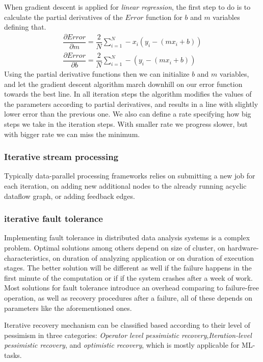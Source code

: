 When gradient descent is applied for \textit{linear regression}, the first step to do is to calculate the partial derivatives of the $Error$ function for  $b$ and $m$ variables defining that.
\begin{align}
\dfrac{\partial Error}{\partial m} = \dfrac{2}{N}\sum_{i=1}^{N} -x_i(y_i-(mx_i+b)) \\
\dfrac{\partial Error}{\partial b} = \dfrac{2}{N}\sum_{i=1}^{N} -(y_i-(mx_i+b))
\end{align}
Using the partial derivative functions then we can initialize $b$ and $m$ variables, and let the gradient descent  algorithm march downhill on our error function towards the best line. In all iteration steps the algorithm modifies the values of the parameters according to partial derivatives, and results in a line with slightly lower error than the previous one. We also can define a rate specifying how big steps we take in the iteration steps. With smaller rate we progress slower, but with bigger rate we can miss the minimum. 
\cite{gradientdescent}%
\subsubsection{Iterative stream processing}
Typically data-parallel processing frameworks relies on  submitting a new job for each iteration, on adding new additional nodes to the already running acyclic dataflow graph, or adding feedback edges. 
\subsubsection{iterative fault tolerance}
Implementing fault tolerance in distributed data analysis systems is a complex problem. Optimal solutions\cite{allroadleadtorome} among others depend on size of cluster, on hardware-characteristics, on duration of analyzing application or on duration of execution stages. The better solution will be different  as well if the failure happens in the first minute of the computation or if if the system crashes after a week of work.
Most solutions for fault tolerance introduce an overhead comparing to failure-free operation, as well as recovery procedures after a failure, all of these depends on parameters like the aforementioned ones.

Iterative recovery mechanism can be classified based according to their level of pessimism in three categories\cite{allroadleadtorome}: \textit{Operator level pessimistic recovery},\textit{Iteration-level pessimistic recovery}, and \textit{optimistic recovery}, which is mostly applicable for ML-tasks. 

